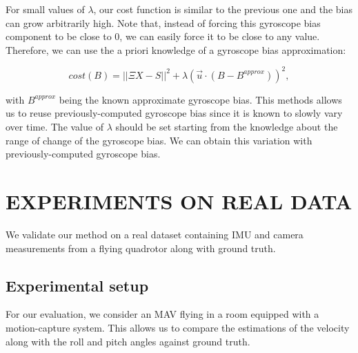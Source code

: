 \documentclass[letterpaper, 10 pt, journal, twoside]{IEEEtran}  %
\begin{document}

For small values of $\lambda$, our cost function is similar to the previous one and the bias can grow arbitrarily high.
Note that, instead of forcing this gyroscope bias component to be close to $0$, we can easily force it to be close to any value.
Therefore, we can use the a priori knowledge of a gyroscope bias approximation:

\[
cost(B) = ||\Xi X - S||^2 +  \lambda (\vec{u} \cdot (B - B^{approx} ))^2,
\]

\noindent with $B^{approx}$ being the known approximate gyroscope bias.
This methods allows us to reuse previously-computed gyroscope bias since it is known to slowly vary over time.
The value of $\lambda$ should be set starting from the knowledge about the range of change of the gyroscope bias.
We can obtain this variation with previously-computed gyroscope bias.

\section{EXPERIMENTS ON REAL DATA}\label{SectionPerformance}

We validate our method on a real dataset containing IMU and camera measurements from a flying quadrotor along with ground truth.

\subsection{Experimental setup}\label{SubsectionSetup}

For our evaluation, we consider an MAV flying in a room equipped with a motion-capture system.
This allows us to compare the estimations of the velocity along with the roll and pitch angles against ground truth.
\end{document}
